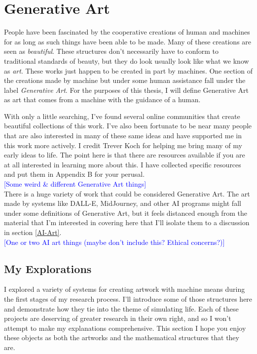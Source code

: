 \documentclass[12pt,twoside]{reedthesis}
\begin{document}
\section{Generative Art}
\label{GenerativeArt}

	People have been fascinated by the cooperative creations of human and machines for as long as such things have been able to be made. Many of these creations are seen as \textit{beautiful}. These structures don't necessarily have to conform to traditional standards of beauty, but they do look usually look like what we know as \textit{art}. These works just happen to be created in part by machines. One section of the creations made by machine but under some human assistance fall under the label \textit{Generative Art}. For the purposes of this thesis, I will define Generative Art as art that comes from a machine with the guidance of a human.
	
	With only a little searching, I've found several online communities that create beautiful collections of this work. I've also been fortunate to be near many people that are also interested in many of these same ideas and have supported me in this work more actively. I credit Trever Koch for helping me bring many of my early ideas to life. The point here is that there are resources available if you are at all interested in learning more about this. I have collected specific resources and put them in Appendix B for your perusal.\\
	
	\textcolor{blue}{[Some weird \& different Generative Art things]}\\
	
	There is a huge variety of work that could be considered Generative Art. The art made by systems like DALL-E, MidJourney, and other AI programs might fall under some definitions of Generative Art, but it feels distanced enough from the material that I'm interested in covering here that I'll isolate them to a discussion in section \ref{AI-Art}.\\
	
	\textcolor{blue}{[One or two AI art things (maybe don't include this? Ethical concerns?)]}
	
\subsection{My Explorations} %
	
	I explored a variety of systems for creating artwork with machine means during the first stages of my research process. I'll introduce some of those structures here and demonstrate how they tie into the theme of simulating life. Each of these projects are deserving of greater research in their own right, and so I won't attempt to make my explanations comprehensive. This section I hope you enjoy these objects as both the artworks and the mathematical structures that they are.\\
\end{document}
